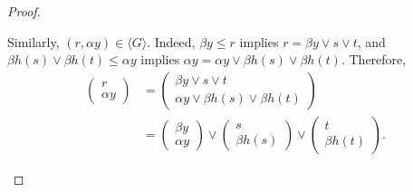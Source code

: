 \begin{proof}
\begin{itemize}
Similarly, $(r, \alpha y) \in \langle G \rangle$.  Indeed, $\beta y \leqslant r$ 
implies $r = \beta y \vee s\vee t$, and 
$\beta {h(s)} \vee \beta {h(t)} \leqslant \alpha y$ implies 
$\alpha y = \alpha y \vee \beta {h(s)} \vee \beta {h(t)}$. Therefore,
\begin{align*}
  \left(\begin{array}{c} r \\ \alpha y\end{array}\right) 
  &=\left(\begin{array}{c} 
          \beta y \vee s\vee t \\ 
          \alpha y \vee \beta {h(s)} \vee \beta {h(t)} 
          \end{array}
    \right)\\
  &=\left(\begin{array}{c} 
          \beta y\\ 
          \alpha y
          \end{array}
    \right) \vee 
    \left(\begin{array}{c}
          s \\ 
          \beta {h(s)}
          \end{array}
    \right) \vee 
    \left(\begin{array}{c}
          t \\ 
          \beta {h(t)} 
          \end{array}
    \right).
\end{align*}


\end{itemize}
\end{proof}

